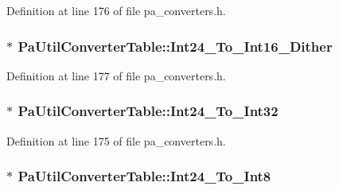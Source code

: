 Definition at line 176 of file pa\+\_\+converters.\+h.

\subsubsection[{\texorpdfstring{Int24\+\_\+\+To\+\_\+\+Int16\+\_\+\+Dither}{Int24_To_Int16_Dither}}]{$\ast$ Pa\+Util\+Converter\+Table\+::\+Int24\+\_\+\+To\+\_\+\+Int16\+\_\+\+Dither}\hypertarget{struct_pa_util_converter_table_a11fdace81e507c56b732f8015235a802}{}\label{struct_pa_util_converter_table_a11fdace81e507c56b732f8015235a802}


Definition at line 177 of file pa\+\_\+converters.\+h.

\subsubsection[{\texorpdfstring{Int24\+\_\+\+To\+\_\+\+Int32}{Int24_To_Int32}}]{$\ast$ Pa\+Util\+Converter\+Table\+::\+Int24\+\_\+\+To\+\_\+\+Int32}\hypertarget{struct_pa_util_converter_table_aa627b4b50c5768277f69d952747b9d72}{}\label{struct_pa_util_converter_table_aa627b4b50c5768277f69d952747b9d72}


Definition at line 175 of file pa\+\_\+converters.\+h.

\subsubsection[{\texorpdfstring{Int24\+\_\+\+To\+\_\+\+Int8}{Int24_To_Int8}}]{$\ast$ Pa\+Util\+Converter\+Table\+::\+Int24\+\_\+\+To\+\_\+\+Int8}\hypertarget{struct_pa_util_converter_table_a917428fa6f2abebe37da9361a50ffade}{}\label{struct_pa_util_converter_table_a917428fa6f2abebe37da9361a50ffade}


